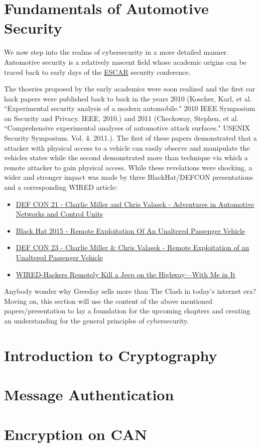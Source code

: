 \section{Fundamentals of Automotive Security}
	We now step into the realms of cybersecurity in a more detailed manner. Automotive security is a relatively nascent field whose academic origins can be traced back to early days of the \href{https://www.escar.info/history/escar-europe/escar-europe-2003-lectures-and-program-committee.html}{ESCAR} security conference.

	The thoeries proposed by the early academics were soon realized and the first car hack papers were published back to back in the years 2010 (Koscher, Karl, et al. ``Experimental security analysis of a modern automobile." 2010 IEEE Symposium on Security and Privacy. IEEE, 2010.) and 2011 (Checkoway, Stephen, et al. ``Comprehensive experimental analyses of automotive attack surfaces." USENIX Security Symposium. Vol. 4. 2011.). The first of these papers demonstrated that a attacker with physical access to a vehicle can easily observe and manipulate the vehicles states while the second demonstrated more than technique via which a remote attacker to gain physical access. While these revelations were shocking, a wider and stronger impact was made by three BlackHat/DEFCON presentations and a corresponding WIRED article:

	\begin{itemize}
		\item \href{https://www.youtube.com/watch?v=n70hIu9lcYo}{DEF CON 21 - Charlie Miller and Chris Valasek - Adventures in Automotive Networks and Control Units}
		\item \href{https://www.youtube.com/watch?v=MAcHkASmXEc}{Black Hat 2015 - Remote Exploitation Of An Unaltered Passenger Vehicle}
		\item \href{https://www.youtube.com/watch?v=OobLb1McxnI}{DEF CON 23 - Charlie Miller \& Chris Valasek - Remote Exploitation of an Unaltered Passenger Vehicle}
		\item \href{https://www.wired.com/2015/07/hackers-remotely-kill-jeep-highway/}{WIRED-Hackers Remotely Kill a Jeep on the Highway—With Me in It}
	\end{itemize}

	Anybody wonder why Greeday sells more than The Clash in today's internet era? Moving on, this section will use the content of the above mentioned papers/presentation to lay a foundation for the upcoming chapters and creating an understanding for the general principles of cybersecurity.

\section{Introduction to Cryptography}

\section{Message Authentication}

\section{Encryption on CAN}


